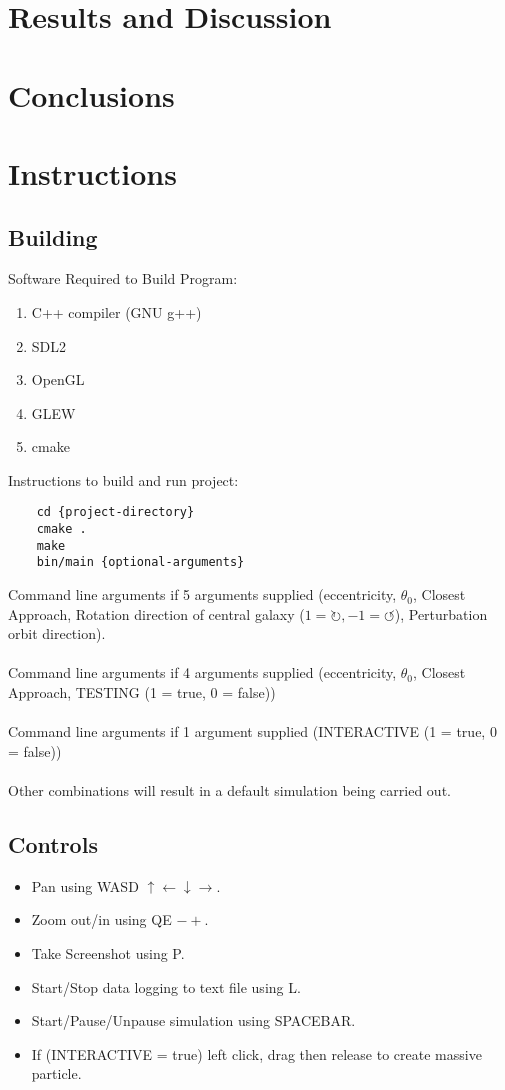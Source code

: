 \documentclass[10pt,a4paper]{article}
\begin{document}
\clearpage
\section{Results and Discussion}


\clearpage
\section{Conclusions}

\clearpage
\section{Instructions}
\subsection{Building}
Software Required to Build Program:
\\
\begin{enumerate}
\item C++ compiler (GNU g++)
\item SDL2
\item OpenGL
\item GLEW
\item cmake
\end{enumerate}

Instructions to build and run project:

\begin{lstlisting}
	cd {project-directory}
	cmake .
	make
	bin/main {optional-arguments}
\end{lstlisting}
Command line arguments if 5 arguments supplied (eccentricity, $\theta_0$, Closest Approach, Rotation direction of central galaxy ($1=\circlearrowright, -1=\circlearrowleft$), Perturbation orbit direction).
\\
\\
Command line arguments if 4 arguments supplied (eccentricity, $\theta_0$, Closest Approach, TESTING (1 = true, 0 = false))
\\
\\
Command line arguments if 1 argument supplied (INTERACTIVE (1 = true, 0 = false))
\\
\\
Other combinations will result in a default simulation being carried out.

\subsection{Controls}
\begin{itemize}
\item Pan using WASD $\uparrow \leftarrow \downarrow \rightarrow$.
\item Zoom out/in using QE $-+$.
\item Take Screenshot using P.
\item Start/Stop data logging to text file using L.
\item Start/Pause/Unpause simulation using SPACEBAR.
\item If (INTERACTIVE = true) left click, drag then release to create massive particle.
\end{itemize}
\end{document}
